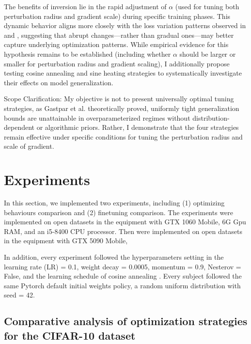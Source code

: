 \documentclass[10pt,twocolumn,letterpaper]{article}
\begin{document}
The benefits of inversion lie in the rapid adjustment of $\alpha$ (used for tuning both perturbation radius and gradient scale) during specific training phases. This dynamic behavior aligns more closely with the loss variation patterns observed in  and , suggesting that abrupt changes—rather than gradual ones—may better capture underlying optimization patterns. While empirical evidence for this hypothesis remains to be established (including whether $\alpha$ should be larger or smaller for perturbation radius and gradient scaling), I additionally propose testing cosine annealing and sine heating strategies to systematically investigate their effects on model generalization.

Scope Clarification: My objective is not to present universally optimal tuning strategies, as Gastpar et al. \cite{gastpar2023fantasticgeneralizationmeasures} theoretically proved, uniformly tight generalization bounds are unattainable in overparameterized regimes without distribution-dependent or algorithmic priors. Rather, I demonstrate that the four strategies remain effective under specific conditions for tuning the perturbation radius and scale of gradient.


\section{Experiments}
\label{sec:4}

In this section, we implemented two experiments, including (1) optimizing behaviours comparison and (2) finetuning comparison. The experiments were implemented on open datasets in the equipment with GTX 1060 Mobile, 6G Gpu RAM, and an i5-8400 CPU processor. Then were implemented on open datasets in the equipment with GTX 5090 Mobile,

In addition, every experiment followed the hyperparameters setting in the learning rate (LR)	= 0.1, weight decay = 0.0005, momentum = 0.9, Nesterov = False, and the learning schedule of cosine annealing \cite{loshchilov2017sgdrstochasticgradientdescent}. Every subject followed the same Pytorch 
default initial weights policy, a random uniform distribution with seed = 42. 

\subsection{Comparative analysis of optimization strategies for the CIFAR-10 dataset}
\label{subsec:4.1}
\end{document}
